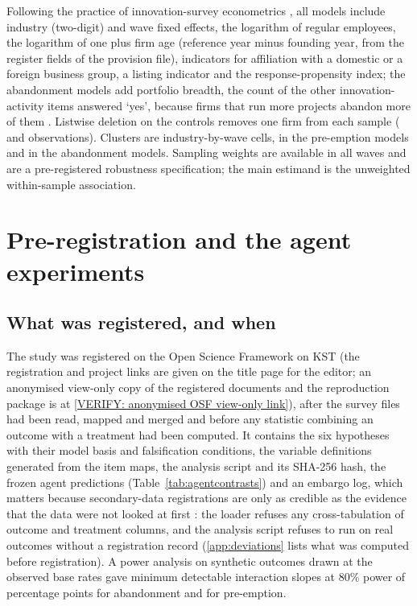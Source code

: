 \documentclass[preprint,12pt,authoryear]{elsarticle}
\newif\ifanon \ifdefined\ANONYMOUS\anontrue\fi
\newcommand{\OSFReviewCopyURL}{[VERIFY: anonymised OSF view-only link]}
\begin{document}
Following the practice of innovation-survey econometrics \citep{mairesse2010using}, all models include industry (two-digit) and wave fixed effects, the logarithm of regular employees, the logarithm of one plus firm age (reference year minus founding year, from the register fields of the provision file), indicators for affiliation with a domestic or a foreign business group, a listing indicator and the response-propensity index; the abandonment models add portfolio breadth, the count of the other innovation-activity items answered `yes', because firms that run more projects abandon more of them \citep{klingebiel2021optionality}. Listwise deletion on the controls removes one firm from each sample (\NPreemptModel{} and \NQuitModel{} observations). Clusters are industry-by-wave cells, \NClusters{} in the pre-emption models and \NClustersQuit{} in the abandonment models. Sampling weights are available in all waves and are a pre-registered robustness specification; the main estimand is the unweighted within-sample association.

\section{Pre-registration and the agent experiments}
\label{sec:prereg}

\subsection{What was registered, and when}

The study was registered on the Open Science Framework on \OSFRegisteredKST{} KST (\ifanon the registration and project links are given on the title page for the editor; an anonymised view-only copy of the registered documents and the reproduction package is at \url{\OSFReviewCopyURL}\else registration \url{\OSFRegistrationURL}; project \url{\OSFProjectURL}\fi), after the survey files had been read, mapped and merged and before any statistic combining an outcome with a treatment had been computed. It contains the six hypotheses with their model basis and falsification conditions, the variable definitions generated from the item maps, the analysis script and its SHA-256 hash, the frozen agent predictions (Table~\ref{tab:agentcontrasts}) and an embargo log, which matters because secondary-data registrations are only as credible as the evidence that the data were not looked at first \citep{weston2019recommendations}: the loader refuses any cross-tabulation of outcome and treatment columns, and the analysis script refuses to run on real outcomes without a registration record (\ref{app:deviations} lists what was computed before registration). A power analysis on synthetic outcomes drawn at the observed base rates gave minimum detectable interaction slopes at 80\% power of \MDEQuitPp{} percentage points for abandonment and \MDEPreemptPp{} for pre-emption.
\end{document}
